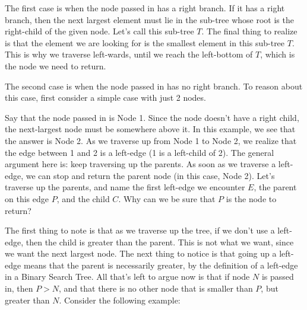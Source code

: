 \begin{solution}[2.5in]
The first case is when the node passed in has a right branch. If it has a right
branch, then the next largest element must lie in the sub-tree whose root is
the right-child of the given node. Let's call this sub-tree $T$. The final
thing to realize is that the element we are looking for is the smallest element
in this sub-tree $T$. This is why we traverse left-wards, until we reach the
left-bottom of $T$, which is the node we need to return.

The second case is when the node passed in has no right branch. To reason about
this case, first consider a simple case with just 2 nodes.

\begin{center}
\end{center}

Say that the node passed in is Node 1. Since the node doesn't have a right
child, the next-largest node must be somewhere above it. In this example, we
see that the answer is Node 2. As we traverse up from Node 1 to Node 2, we
realize that the edge between 1 and 2 is a left-edge (1 is a left-child of 2).
The general argument here is: keep traversing up the parents. As soon as we
traverse a left-edge, we can stop and return the parent node (in this case,
Node 2). Let's traverse up the parents, and name the first left-edge we
encounter $E$, the parent on this edge $P$, and the child $C$. Why can we be
sure that $P$ is the node to return?

The first thing to note is that as we traverse up the tree, if we don't use a
left-edge, then the child is greater than the parent. This is not what we want,
since we want the next largest node. The next thing to notice is that going up
a left-edge means that the parent is necessarily greater, by the definition of
a left-edge in a Binary Search Tree. All that's left to argue now is that if
node $N$ is passed in, then $P>N$, and that there is no other node that is
smaller than $P$, but greater than $N$. Consider the following example:

\begin{center}
\end{center}


\end{solution}
